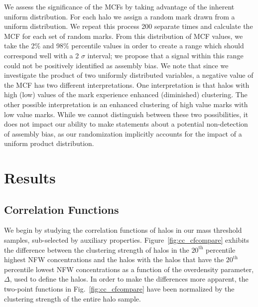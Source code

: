 \documentclass[usenatbib,fleqn]{mnras}
\begin{document}
We assess the significance of the MCFs by taking advantage of the inherent uniform distribution. For each halo we assign a random mark drawn from a uniform distribution. We repeat this process 200 separate times and calculate the MCF for each set of random marks. From this distribution of MCF values, we take the 2\% and 98\% percentile values in order to create a range which should correspond well with a 2 $\sigma$ interval; we propose that a signal within this range could not be positively identified as assembly bias. We note that since we investigate the product of two uniformly distributed variables, a negative value of the MCF has two different interpretations. One interpretation is that halos with high (low) values of the mark experience enhanced (diminished) clustering. The other possible interpretation is an enhanced clustering of high value marks with low value marks. While we cannot distinguish between these two possibilities, it does not impact our ability to make statements about a potential non-detection of assembly bias, as our randomization implicitly accounts for the impact of a uniform product distribution.


\section[]{Results}
\label{section:results}


\subsection{Correlation Functions}
\label{sub:cfresults}


We begin by studying the correlation functions of halos in our mass threshold samples, sub-selected by auxiliary
properties. Figure~\ref{fig:cc_cfcompare} exhibits the difference between the clustering strength of halos in the
$20^{\mathrm{th}}$ percentile highest NFW concentrations and the halos with the halos that have the
$20^{\mathrm{th}}$ percentile lowest NFW concentrations as a function of the overdensity parameter, $\Delta$, used to
define the halos. In order to make the differences more apparent, the two-point functions in 
Fig.~\ref{fig:cc_cfcompare} have been normalized by the clustering strength of the entire halo sample. 
\end{document}
